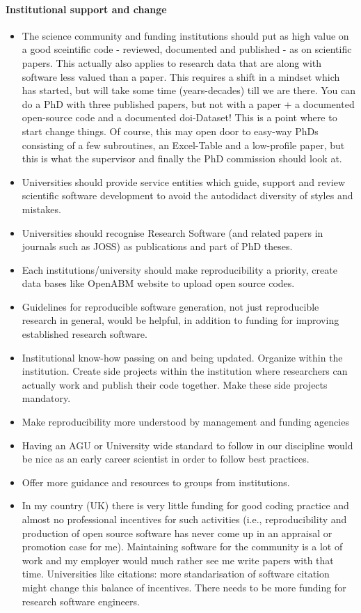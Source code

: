 \documentclass{article}
\begin{document}
\paragraph{Institutional support and change}
\begin{itemize}
	\item The science community and funding institutions should put as high value on a good sceintific code - reviewed, documented and published - as on scientific papers. This actually also applies to research data that are along with software less valued than a paper. This requires a shift in a mindset which has started, but will take some time (years-decades) till we are there. You can do a PhD with three published papers, but not with a paper + a documented open-source code and a documented doi-Dataset! This is a point where to start change things. Of course, this may open door to easy-way PhDs consisting of a few subroutines, an Excel-Table and a low-profile paper, but this is what the supervisor and finally the PhD commission should look at.
	\item Universities should provide service entities which guide, support and review scientific software development to avoid the autodidact diversity of styles and mistakes.
	\item Universities should recognise Research Software (and related papers in journals such as JOSS) as publications and part of PhD theses. 
	\item Each institutions/university should make reproducibility a priority, create data bases like OpenABM website to upload open source codes.
	\item Guidelines for reproducible software generation, not just reproducible research in general, would be helpful, in addition to funding for improving established research software.
	\item Institutional know-how passing on and being updated. Organize within the institution. Create side projects within the institution where researchers can actually work and publish their code together. Make these side projects mandatory.
	\item Make reproducibility more understood by management and funding agencies
	\item Having an AGU or University wide standard to follow in our discipline would be nice as an early career scientist in order to follow best practices. 
	\item Offer more guidance and resources to groups from institutions.
	\item In my country (UK) there is very little funding for good coding practice and almost no professional incentives for such activities (i.e., reproducibility and production of open source software has never come up in an appraisal or promotion case for me). 
Maintaining software for the community is a lot of work and my employer would much rather see me write papers with that time. 
Universities like citations: more standarisation of software citation might change this balance of incentives. 
There needs to be more funding for research software engineers.
\end{itemize}
\end{document}
